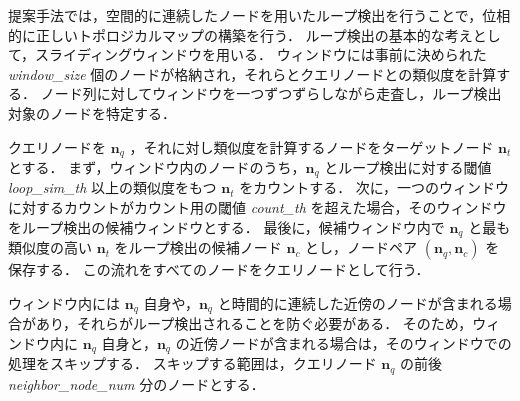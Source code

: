 \documentclass[conference]{IEEEtran}
\begin{document}
提案手法では，空間的に連続したノードを用いたループ検出を行うことで，位相的に正しいトポロジカルマップの構築を行う．
ループ検出の基本的な考えとして，スライディングウィンドウを用いる．
ウィンドウには事前に決められた \textit{window\_size} 個のノードが格納され，それらとクエリノードとの類似度を計算する．
ノード列に対してウィンドウを一つずつずらしながら走査し，ループ検出対象のノードを特定する．


クエリノードを $\bm{n}_q$ ，それに対し類似度を計算するノードをターゲットノード $\bm{n}_t$ とする．
まず，ウィンドウ内のノードのうち，$\bm{n}_q$ とループ検出に対する閾値 \textit{loop\_sim\_th} 以上の類似度をもつ $\bm{n}_t$ をカウントする．
次に，一つのウィンドウに対するカウントがカウント用の閾値 \textit{count\_th} を超えた場合，そのウィンドウをループ検出の候補ウィンドウとする．
最後に，候補ウィンドウ内で $\bm{n}_q$ と最も類似度の高い $\bm{n}_t$ をループ検出の候補ノード $\bm{n}_c$ とし，ノードペア $(\bm{n}_q, \bm{n}_c)$ を保存する．
この流れをすべてのノードをクエリノードとして行う．

ウィンドウ内には $\bm{n}_q$ 自身や，$\bm{n}_q$ と時間的に連続した近傍のノードが含まれる場合があり，それらがループ検出されることを防ぐ必要がある．
そのため，ウィンドウ内に $\bm{n}_q$ 自身と，$\bm{n}_q$ の近傍ノードが含まれる場合は，そのウィンドウでの処理をスキップする．
スキップする範囲は，クエリノード $\bm{n}_q$ の前後 \textit{neighbor\_node\_num} 分のノードとする．
\end{document}
